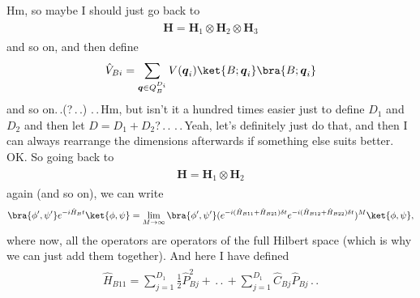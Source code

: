 \documentclass{report}
\begin{document}
Hm, so maybe I should just go back to 
\begin{align}
\begin{aligned}
	\textbf{H} = \textbf{H}_1 \otimes \textbf{H}_2 \otimes \textbf{H}_3
\end{aligned}
\end{align} 
and so on, and then define
\begin{align}
\begin{aligned}
	\hat V_{Bi} = \sum_{\boldsymbol{q} \in Q_{B}^{D_i}} 
		V(\boldsymbol{q}_i) \ket{B; \boldsymbol{q}_i} \bra{B; \boldsymbol{q}_i}
	\label{V_Bi_01}
\end{aligned}
\end{align} 
and so on.\,.(?\,.\,.) .\,.\,Hm, but isn't it a hundred times easier just to define $D_1$ and $D_2$ and then let $D = D_1 + D_2$?\,.\,. .\,.\,Yeah, let's definitely just do that, and then I can always rearrange the dimensions afterwards if something else suits better. OK. So going back to 
\begin{align}
\begin{aligned}
	\textbf{H} = \textbf{H}_1 \otimes \textbf{H}_2
\end{aligned}
\end{align} 
again (and so on), we can write 
\begin{align}
\begin{aligned}
	\bra{\phi', \psi'}
		e^{-i \hat H_{B} t}
	\ket{\phi, \psi} =
	\lim_{M \to \infty} 
	\bra{\phi', \psi'}
		(e^{-i  (\hat H_{B11} + \hat H_{B21}) \delta t} e^{-i (\hat H_{B12} + \hat H_{B22}) \delta t})^M
	\ket{\phi, \psi},
\end{aligned}
\end{align} 
where now, all the operators are operators of the full Hilbert space (which is why we can just add them together). And here I have defined
\begin{align}
\begin{aligned}
	\hat H_{B11} =  
		\sum_{j=1}^{D_1} \frac{1}{2} \hat P_{B j}^2 + 
		\,.\,.\, +%
		\sum_{j=1}^{D_1} \hat C_{B j} \hat P_{B j}\,.\,.
	\label{H_B11_01}
\end{aligned}
\end{align} 
\end{document}

